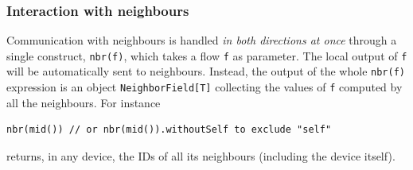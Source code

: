 %

\subsubsection{Interaction with neighbours}
%
Communication with neighbours is handled \emph{in both directions at once} through a single construct, \lstinline|nbr(f)|, which takes a flow \texttt{f} as parameter.
%
The local output of \texttt{f} will be automatically sent to neighbours.
%
Instead, the output of the whole \lstinline|nbr(f)| expression
 is an object \lstinline|NeighborField[T]|
 collecting the values of \texttt{f} computed by all the neighbours.
%
For instance
%
\begin{lstlisting}
nbr(mid()) // or nbr(mid()).withoutSelf to exclude "self"
\end{lstlisting}
%
returns, in any device, the IDs of all its neighbours (including the device itself).
%
%
%
%
%
%

